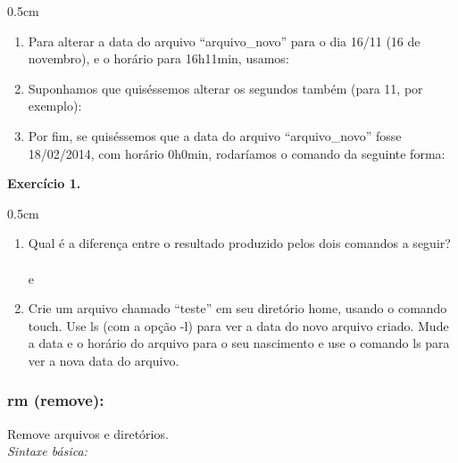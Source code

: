 \begin{refsection}
\begin {myindentpar}{0.5cm}
\begin{enumerate}[\itshape i.]
 \item{Para alterar a data do arquivo ``arquivo\_novo'' para o dia 16/11 (16 de novembro), e o horário para 16h11min, usamos:}

 \item{Suponhamos que quiséssemos alterar os segundos também (para 11, por exemplo):}

 \item{Por fim, se quiséssemos que a data do arquivo ``arquivo\_novo'' fosse 18/02/2014, com horário 0h0min, rodaríamos o comando da seguinte forma:}


 \end{enumerate}
 \end{myindentpar}

\begin{blackBlock}{\textbf{Exercício 1.}}\label{tut1:ex:1.\arabic{ex}}

 \begin {myindentpar}{0.5cm}
 \begin{enumerate}[\itshape i.]
  \item{Qual é a diferença entre o resultado produzido pelos dois comandos a seguir?}
\\
	\\
e\\

 \item{Crie um arquivo chamado ``teste'' em seu diretório home, usando o comando touch. Use ls (com a opção -l) para ver a data do novo arquivo criado. Mude a data e o horário do arquivo para o seu nascimento e use o comando ls para ver a nova data do arquivo.}

 \end{enumerate}
 \end{myindentpar}

\end{blackBlock}

\subsubsection{rm (remove):}\label{tut1:text_mode:commands:rm}
Remove arquivos e diretórios.\\
 \textit{Sintaxe básica:}
\\


\end{refsection}
